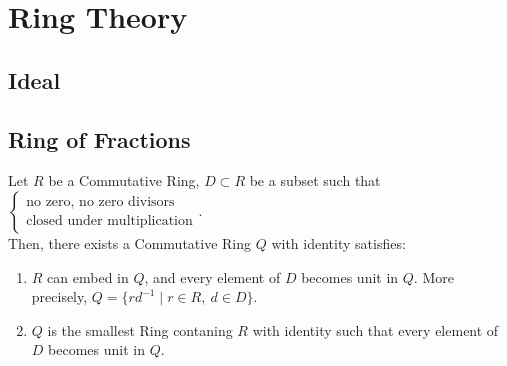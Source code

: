
\chapter{Ring Theory}

\section{Ideal}

\section{Ring of Fractions}
\begin{theorem}
    Let $R$ be a Commutative Ring, $D \subset R$ be a subset such that $\begin{cases}
        \text{no zero, no zero divisors} \\ \text{closed under multiplication}
    \end{cases}$. \\
    Then, there exists a Commutative Ring $Q$ with identity satisfies:
    \begin{enumerate}
        \item $R$ can embed in $Q$, and every element of $D$ becomes unit in $Q$.
        More precisely, $Q = \{r d^{-1} \mid r \in R,\ d \in D\}$.
        \item $Q$ is the smallest Ring contaning $R$ with identity such that every element of $D$ becomes unit in $Q$.
    \end{enumerate}
\end{theorem}
